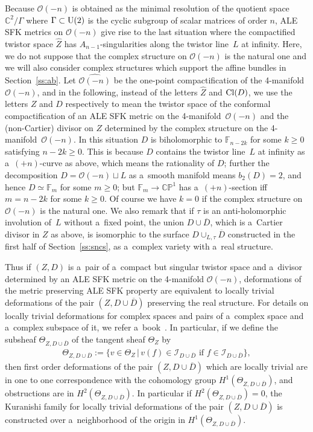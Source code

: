 \documentclass[pdftex]{sigma}
\numberwithin{equation}{section}
\begin{document}
Because $\mathscr O(-n)$ is obtained as the minimal resolution of the quotient space $\mathbb{C}^2/\Gamma$ where
$\Gamma\subset{\rm{U}}(2)$ is the cyclic subgroup of scalar matrices of order $n$, ALE SFK metrics on $\mathscr O(-n)$
give rise to the last situation where the compactif\/ied twistor space $\hat Z$ has $A_{n-1}$-singularities along the
twistor line~$L$ at inf\/inity.
Here, we do not suppose that the complex structure on $\mathscr O(-n)$ is the natural one and we will also consider
complex structures which support the af\/f\/ine bundles in Section~\ref{ss:ab}.
Let $\widehat{\mathscr O(-n)}$ be the one-point compactif\/ication of the 4-manifold $\mathscr O(-n)$, and in the
following, instead of the letters $\hat Z$ and ${\rm{Cl}}(D)$, we use the letters $Z$ and $D$ respectively to mean the
twistor space of the conformal compactif\/ication of an ALE SFK metric on the 4-mani\-fold~$\mathscr O(-n)$ and the
(non-Cartier) divisor on $Z$ determined by the complex structure on the 4-mani\-fold~$\mathscr O(-n)$.
In this situation $D$ is biholomorphic to $\mathbb{F}_{n-2k}$ for some $k\ge 0$ satisfying $n-2k\ge 0$.
This is because $D$ contains the twistor line~$L$ at inf\/inity as a~$(+n)$-curve as above, which means the rationality
of $D$; further the decomposition $D=\mathscr O(-n)\sqcup L$ as a~smooth manifold means $b_2(D) = 2$, and hence
$D\simeq\mathbb{F}_m$ for some $m\ge 0$; but $\mathbb{F}_m\to\mathbb{CP}^1$ has a~$(+n)$-section if\/f $m=n-2k$ for some $k\ge0$.
Of course we have $k=0$ if the complex structure on $\mathscr O(-n)$ is the natural one.
We also remark that if $\tau$ is an anti-holomorphic involution of~$L$ without a~f\/ixed point, the union
$D\cup\overline D$, which is a~Cartier divisor in $Z$ as above, is isomorphic to the surface $D\cup_{L,\tau}\overline D$
constructed in the f\/irst half of Section~\ref{ss:sncs}, as a~complex variety with a~real structure.

Thus if $(Z,D)$ is a~pair of a~compact but singular twistor space and a~divisor determined by an ALE SFK metric on the
4-manifold $\mathscr O(-n)$, deformations of the metric preserving ALE SFK property are equivalent to locally trivial
deformations of the pair $(Z,D\cup\overline D)$ preserving the real structure.
For details on locally trivial deformations for complex spaces and pairs of a~complex space and a~complex subspace of
it, we refer a~book~\cite[Section~3.4]{SeBook}.
In particular, if we def\/ine the subsheaf $\Theta_{Z, D\cup\overline D}$ of the tangent sheaf $\Theta_Z$ by
\begin{gather*}
\Theta_{Z, D\cup\overline D}:=\big\{v\in \Theta_Z\,|\, v(f) \in \mathscr I_{D\cup\overline D}
\text{ if }
f\in \mathscr I_{D\cup\overline D}\big\},
\end{gather*}
then f\/irst order deformations of the pair $(Z,D\cup\overline D)$ which are locally trivial are in one to one
correspondence with the cohomology group $H^1(\Theta_{Z,D\cup\overline D})$, and obstructions are in
$H^2(\Theta_{Z,D\cup\overline D})$.
In particular if $H^2(\Theta_{Z,D\cup\overline D})=0$, the Kuranishi family for locally trivial deformations of the pair
$(Z, D\cup\overline D)$ is constructed over a~neighborhood of the origin in $H^1(\Theta_{Z,D\cup\overline D})$.
\end{document}
